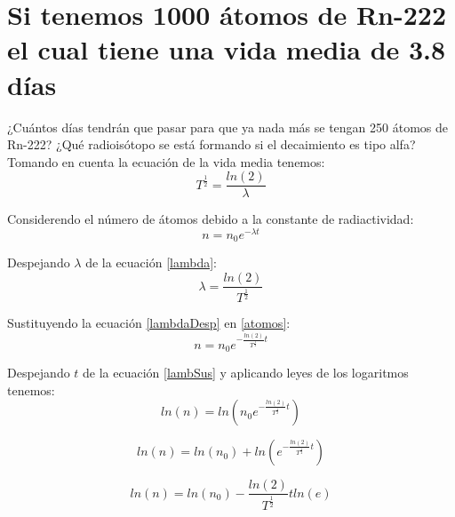 \documentclass[]{article}
\begin{document}
\section{Si tenemos 1000 átomos de Rn-222 el cual tiene una vida media de 3.8 días}

¿Cuántos días tendrán que
pasar para que ya nada más se tengan 250 átomos de Rn-222? ¿Qué radioisótopo se está formando si el
decaimiento es tipo alfa?\\

Tomando en cuenta la ecuación de la vida media tenemos:\\

\begin{equation}
  T^{\frac{1}{2}}=\frac{ln(2)}{\lambda}
  \label{lambda}
\end{equation}

Considerendo el número de átomos debido a la constante de radiactividad:\\

\begin{equation}
 n=n_0e^{-\lambda t}
 \label{atomos}
\end{equation}

Despejando $\lambda$ de la ecuación \ref{lambda}:\\

\begin{equation}
  \lambda=\frac{ln(2)}{T^{\frac{1}{2}}}
  \label{lambdaDesp}
\end{equation}

Sustituyendo la ecuación \ref{lambdaDesp} en \ref{atomos}:\\

\begin{equation}
 n=n_0e^{- \frac{ln(2)}{T^{\frac{1}{2}}} t}
 \label{lambSus}
\end{equation}

Despejando $t$ de la ecuación \ref{lambSus} y aplicando leyes de los logaritmos tenemos:\\

\begin{equation}
ln(n)=ln(n_0e^{- \frac{ln(2)}{T^{\frac{1}{2}}} t})
\end{equation}


\begin{equation}
ln(n)=ln(n_0)+ln(e^{- \frac{ln(2)}{T^{\frac{1}{2}}} t})
\end{equation}

\begin{equation}
ln(n)=ln(n_0)- \frac{ln(2)}{T^{\frac{1}{2}}}t ln(e)
\end{equation}
\end{document}
